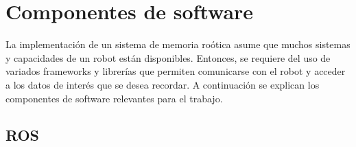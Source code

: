 %



%


%
%





\section{Componentes de software}

La implementaci\'on de un sistema de memoria ro\'otica asume que muchos sistemas y capacidades de un robot est\'an disponibles. Entonces, se requiere del uso de variados frameworks y librer\'ias que permiten comunicarse con el robot y acceder a los datos de inter\'es que se desea recordar. A continuaci\'on se explican los componentes de software relevantes para el trabajo.

\subsection{ROS}


